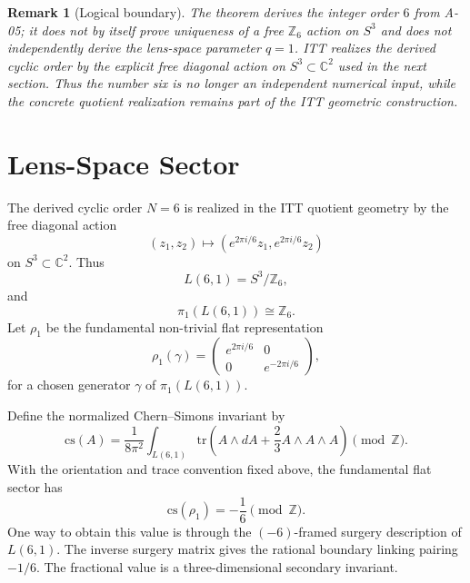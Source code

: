 \documentclass[11pt,a4paper]{article}
\newtheorem{remark}[definition]{Remark}
\begin{document}
\begin{remark}[Logical boundary]
The theorem derives the integer order $6$ from A-05; it does not by itself prove uniqueness of a free $\mathbb Z_6$ action on $S^3$ and does not independently derive the lens-space parameter $q=1$. ITT realizes the derived cyclic order by the explicit free diagonal action on $S^3\subset\mathbb C^2$ used in the next section. Thus the number six is no longer an independent numerical input, while the concrete quotient realization remains part of the ITT geometric construction.
\end{remark}

\section{Lens-Space Sector}

The derived cyclic order $N=6$ is realized in the ITT quotient geometry by the free diagonal action
\begin{equation}
(z_1,z_2)
\longmapsto
\left(e^{2\pi i/6}z_1,e^{2\pi i/6}z_2\right)
\end{equation}
on $S^3\subset\mathbb C^2$. Thus
\begin{equation}
\boxed{
L(6,1)=S^3/\mathbb Z_6,
}
\end{equation}
and
\begin{equation}
\pi_1(L(6,1))\cong\mathbb Z_6.
\end{equation}
Let $\rho_1$ be the fundamental non-trivial flat representation
\begin{equation}
\rho_1(\gamma)
=
\begin{pmatrix}
 e^{2\pi i/6}&0\\
 0&e^{-2\pi i/6}
\end{pmatrix},
\end{equation}
for a chosen generator $\gamma$ of $\pi_1(L(6,1))$.

Define the normalized Chern--Simons invariant by
\begin{equation}
\mathrm{cs}(A)
=
\frac{1}{8\pi^2}
\int_{L(6,1)}
\mathrm{tr}
\left(
A\wedge dA+\frac23A\wedge A\wedge A
\right)
\pmod{\mathbb Z}.
\end{equation}
With the orientation and trace convention fixed above, the fundamental flat sector has
\begin{equation}
\boxed{
\mathrm{cs}(\rho_1)=-\frac16\pmod{\mathbb Z}.
}
\end{equation}
One way to obtain this value is through the $(-6)$-framed surgery description of $L(6,1)$\cite{Jeffrey1992,KirkKlassen1990}. The inverse surgery matrix gives the rational boundary linking pairing $-1/6$. The fractional value is a three-dimensional secondary invariant.
\end{document}
